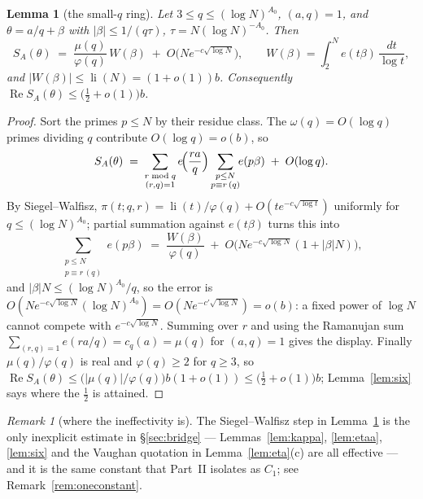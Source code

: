 \documentclass[11pt,a4paper]{article}
\theoremstyle{plain}
\newtheorem{lemma}[theorem]{Lemma}
\theoremstyle{definition}
\theoremstyle{remark}
\newtheorem{remark}[theorem]{Remark}
\begin{document}
\begin{lemma}[the small-$q$ ring]\label{lem:etab}
Let $3\le q\le(\log N)^{A_0}$, $(a,q)=1$, and $\theta=a/q+\beta$ with
$|\beta|\le1/(q\tau)$, $\tau=N(\log N)^{-A_0}$. Then
\[
  S_A(\theta)\;=\;\frac{\mu(q)}{\varphi(q)}\,W(\beta)\;+\;O\!\bigl(N e^{-c\sqrt{\log N}}\bigr),
  \qquad W(\beta)=\int_2^{N}e(t\beta)\,\frac{dt}{\log t},
\]
and $|W(\beta)|\le\operatorname{li}(N)=(1+o(1))b$. Consequently
$\operatorname{Re}S_A(\theta)\le\bigl(\tfrac12+o(1)\bigr)b$.
\end{lemma}

\begin{proof}
Sort the primes $p\le N$ by their residue class. The $\omega(q)=O(\log q)$ primes dividing $q$
contribute $O(\log q)=o(b)$, so
\[
  S_A(\theta)\;=\;\sum_{\substack{r\bmod q\\(r,q)=1}}e\!\Bigl(\frac{ra}{q}\Bigr)
    \sum_{\substack{p\le N\\p\equiv r\,(q)}}\!\!e(p\beta)\;+\;O(\log q).
\]
By Siegel--Walfisz, $\pi(t;q,r)=\operatorname{li}(t)/\varphi(q)+O(te^{-c\sqrt{\log t}})$
uniformly for $q\le(\log N)^{A_0}$; partial summation against $e(t\beta)$ turns this into
\[
  \sum_{\substack{p\le N\\p\equiv r\,(q)}}\!\!e(p\beta)
  \;=\;\frac{W(\beta)}{\varphi(q)}
     \;+\;O\!\bigl(Ne^{-c\sqrt{\log N}}(1+|\beta|N)\bigr),
\]
and $|\beta|N\le(\log N)^{A_0}/q$, so the error is $O(Ne^{-c\sqrt{\log N}}(\log N)^{A_0})
=O(Ne^{-c'\sqrt{\log N}})=o(b)$: a fixed power of $\log N$ cannot compete with
$e^{-c\sqrt{\log N}}$. Summing over $r$ and using the Ramanujan sum
$\sum_{(r,q)=1}e(ra/q)=c_q(a)=\mu(q)$ for $(a,q)=1$ gives the display. Finally
$\mu(q)/\varphi(q)$ is real and $\varphi(q)\ge2$ for $q\ge3$, so
$\operatorname{Re}S_A(\theta)\le\bigl(|\mu(q)|/\varphi(q)\bigr)b(1+o(1))\le
\bigl(\tfrac12+o(1)\bigr)b$; Lemma~\ref{lem:six} says where the $\tfrac12$ is attained.
\end{proof}

\begin{remark}[where the ineffectivity is]\label{rem:whereC1}
The Siegel--Walfisz step in Lemma~\ref{lem:etab} is the only inexplicit estimate in
\S\ref{sec:bridge} --- Lemmas~\ref{lem:kappa}, \ref{lem:etaa}, \ref{lem:six} and the Vaughan
quotation in Lemma~\ref{lem:eta}(c) are all effective --- and it is the same constant that
Part~II isolates as $C_1$; see Remark~\ref{rem:oneconstant}.
\end{remark}
\end{document}
